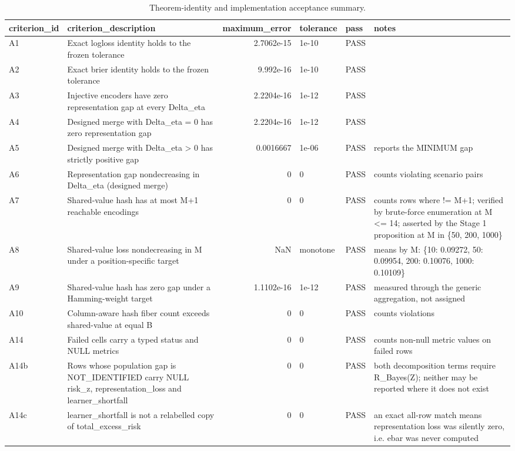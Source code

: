 \begin{table}
\caption{Theorem-identity and implementation acceptance summary.}
\label{tab:tabs2}
\begin{tabular}{llrlll}
\toprule
criterion\_id & criterion\_description & maximum\_error & tolerance & pass & notes \\
\midrule
A1 & Exact logloss identity holds to the frozen tolerance & 2.7062e-15 & 1e-10 & PASS &  \\
A2 & Exact brier identity holds to the frozen tolerance & 9.992e-16 & 1e-10 & PASS &  \\
A3 & Injective encoders have zero representation gap at every Delta\_eta & 2.2204e-16 & 1e-12 & PASS &  \\
A4 & Designed merge with Delta\_eta = 0 has zero representation gap & 2.2204e-16 & 1e-12 & PASS &  \\
A5 & Designed merge with Delta\_eta > 0 has strictly positive gap & 0.0016667 & 1e-06 & PASS & reports the MINIMUM gap \\
A6 & Representation gap nondecreasing in Delta\_eta (designed merge) & 0 & 0 & PASS & counts violating scenario pairs \\
A7 & Shared-value hash has at most M+1 reachable encodings & 0 & 0 & PASS & counts rows where != M+1; verified by brute-force enumeration at M <= 14; asserted by the Stage 1 proposition at M in \{50, 200, 1000\} \\
A8 & Shared-value loss nondecreasing in M under a position-specific target & NaN & monotone & PASS & means by M: \{10: 0.09272, 50: 0.09954, 200: 0.10076, 1000: 0.10109\} \\
A9 & Shared-value hash has zero gap under a Hamming-weight target & 1.1102e-16 & 1e-12 & PASS & measured through the generic aggregation, not assigned \\
A10 & Column-aware hash fiber count exceeds shared-value at equal B & 0 & 0 & PASS & counts violations \\
A14 & Failed cells carry a typed status and NULL metrics & 0 & 0 & PASS & counts non-null metric values on failed rows \\
A14b & Rows whose population gap is NOT\_IDENTIFIED carry NULL risk\_z, representation\_loss and learner\_shortfall & 0 & 0 & PASS & both decomposition terms require R\_Bayes(Z); neither may be reported where it does not exist \\
A14c & learner\_shortfall is not a relabelled copy of total\_excess\_risk & 0 & 0 & PASS & an exact all-row match means representation loss was silently zero, i.e. ebar was never computed \\
\bottomrule
\end{tabular}
\end{table}
